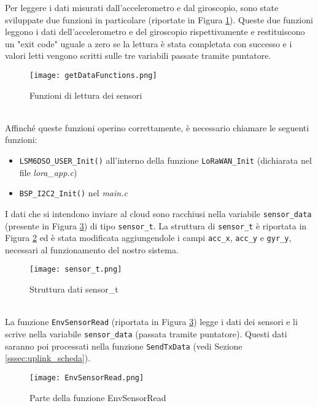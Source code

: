 Per leggere i dati misurati dall'accelerometro e dal giroscopio, sono state sviluppate due funzioni in particolare (riportate in Figura \ref{fig:lettura_sensori}). Queste due funzioni leggono i dati dell'accelerometro e del giroscopio rispettivamente e restituiscono un "exit code" uguale a zero se la lettura è stata completata con successo e i valori letti vengono scritti sulle tre variabili passate tramite puntatore.
\begin{figure}[h!]
  \centering
  \texttt{[image: getDataFunctions.png]}
  \caption{Funzioni di lettura dei sensori}
  \label{fig:lettura_sensori}
\end{figure}
\\Affinché queste funzioni operino correttamente, è necessario chiamare le seguenti funzioni:
\begin{itemize}
  \item \Verb|LSM6DSO_USER_Init()| all'interno della funzione \Verb|LoRaWAN_Init| (dichiarata nel file \textit{lora\_app.c})
  \item \Verb|BSP_I2C2_Init()| nel \textit{main.c}
\end{itemize}
I dati che si intendono inviare al cloud sono racchiusi nella variabile \Verb|sensor_data| (presente in Figura \ref{fig:envsensorread}) di tipo \Verb|sensor_t|. La struttura di \Verb|sensor_t| è riportata in Figura \ref{fig:sensor_t} ed è stata modificata aggiungendole i campi \Verb|acc_x|, \Verb|acc_y| e \Verb|gyr_y|, necessari al funzionamento del nostro sistema.
\begin{figure}[h!]
  \centering
  \texttt{[image: sensor\_t.png]}
  \caption{Struttura dati sensor\_t}
  \label{fig:sensor_t}
\end{figure}
\\La funzione \Verb|EnvSensorRead| (riportata in Figura \ref{fig:envsensorread}) legge i dati dei sensori e li scrive nella variabile \Verb|sensor_data| (passata tramite puntatore). Questi dati saranno poi processati nella funzione \Verb|SendTxData| (vedi Sezione \ref{sssec:uplink_scheda}).
\begin{figure}[h]
  \centering
  \texttt{[image: EnvSensorRead.png]}
  \caption{Parte della funzione EnvSensorRead}
  \label{fig:envsensorread}
\end{figure}

